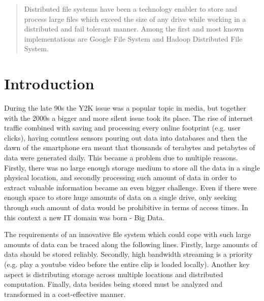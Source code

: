 \documentclass{sig-alternate}
\begin{document}


\maketitle
\begin{abstract}
Distributed file systems have been a technology enabler to store and process large files which exceed the size of any drive while working in a distributed and fail tolerant manner. Among the first and most known implementations are Google File System and Hadoop Distributed File System.
\end{abstract}




\section{Introduction}
During the late 90s the Y2K issue was a popular topic in media, but together with the 2000s a bigger and more silent issue took its place. 
The rise of internet traffic combined with saving and processing every online footprint (e.g. user clicks), having countless sensors pouring out data into databases and then the dawn of the smartphone era meant that thousands of terabytes and petabytes of data were generated daily. 
This became a problem due to multiple reasons. Firstly, there was no large enough storage medium to store all the data in a single physical location, and secondly processing such amount of data in order to extract valuable information became an even bigger challenge. Even if there were enough space to store huge amounts of data on a single drive, only seeking through such amount of data would be prohibitive in terms of access times. In this context a new IT domain was born - Big Data. 

The requirements of an innovative file system which could cope with such large amounts of data can be traced along the following lines.
Firstly, large amounts of data should be stored reliably. 
Secondly, high bandwidth streaming is a priority (e.g. play a youtube video before the entire clip is loaded locally).
Another key aspect is distributing storage across multiple locations
and distributed computation.
Finally, data besides being stored must be analyzed and transformed in a cost-effective manner.
\end{document}
